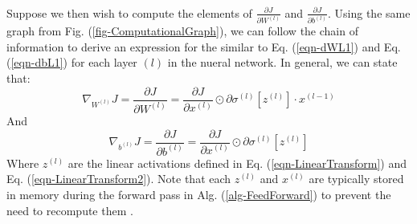 \documentclass[12pt,letterpaper]{article}
\begin{document}
\paragraph*{}Suppose we then wish to compute the elements of $\frac{\partial J}{\partial W^{(l)}}$ and $\frac{\partial J}{\partial b^{(l)}}$. Using the same graph from Fig. (\ref{fig-ComputationalGraph}), we can follow the chain of information to derive an expression for the similar to Eq. (\ref{eqn-dWL1}) and Eq. (\ref{eqn-dbL1}) for each layer $(l)$ in the nueral network. In general, we can state that:
\begin{equation}
\label{eqn-dWGeneral}
\nabla_{W^{(l)}}J = \frac{\partial J}{\partial W^{(l)}} = 
\frac{\partial J}{\partial x^{(l)}}\odot \partial\sigma^{(l)}[ z^{(l)} ] \cdot x^{(l-1)}
\end{equation}
And
\begin{equation}
\label{eqn-dbGeneral}
\nabla_{b^{(l)}}J = \frac{\partial J}{\partial b^{(l)}} = 
\frac{\partial J}{\partial x^{(l)}}\odot \partial\sigma^{(l)}[ z^{(l)} ]
\end{equation}
Where $z^{(l)}$ are the linear activations defined in Eq. (\ref{eqn-LinearTransform}) and Eq. (\ref{eqn-LinearTransform2}). Note that each $z^{(l)}$ and $x^{(l)}$ are typically stored in memory during the forward pass in Alg. (\ref{alg-FeedForward}) to prevent the need to recompute them \cite{Geron2,Goodfellow}.
\end{document}

